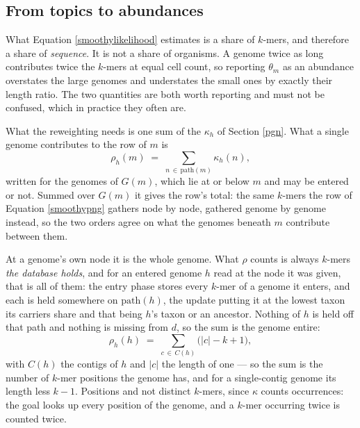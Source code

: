 \documentclass[pdflatex,sn-vancouver-num]{sn-jnl}
\begin{document}
    \subsection{From topics to abundances}\label{abundances}
    What Equation \eqref{smoothylikelihood} estimates is a share of $k$-mers, and therefore a share of
    \emph{sequence}. It is not a share of organisms. A genome twice as long contributes twice the
    $k$-mers at equal cell count, so reporting $\theta_m$ as an abundance overstates the large genomes
    and understates the small ones by exactly their length ratio. The two quantities are both worth
    reporting and must not be confused, which in practice they often are.

    What the reweighting needs is one sum of the $\kappa_h$ of Section \ref{pgn}. What a single
    genome contributes to the row of $m$ is
    \begin{equation}\label{smoothyrho}
        \rho_h(m) \;=\; \sum_{n \,\in\, \mathrm{path}(m)} \kappa_h(n) ,
    \end{equation}
    written for the genomes of $G(m)$, which lie at or below $m$ and may be entered or not.
    Summed over $G(m)$ it gives the row's total: the same $k$-mers the row of
    Equation \eqref{smoothypng} gathers node by node, gathered genome by genome instead, so the two
    orders agree on what the genomes beneath $m$ contribute between them.

    At a genome's own node it is the whole genome. What $\rho$ counts is always $k$-mers \emph{the
    database holds}, and for an entered genome $h$ read at the node it was given, that is all of them: the entry phase stores every $k$-mer of a genome it enters, and each is
    held somewhere on $\mathrm{path}(h)$, the update putting it at the lowest taxon its carriers
    share and that being $h$'s taxon or an ancestor. Nothing of $h$ is held off that path and nothing
    is missing from $d$, so the sum is the genome entire:
    \begin{equation}\label{smoothyrhog}
        \rho_h(h) \;=\; \sum_{c \,\in\, C(h)} \bigl( \lvert c \rvert - k + 1 \bigr) ,
    \end{equation}
    with $C(h)$ the contigs of $h$ and $\lvert c \rvert$ the length of one --- so the sum is the
    number of $k$-mer positions the genome has, and for a single-contig genome its length less
    $k - 1$. Positions and not distinct $k$-mers, since $\kappa$ counts
    occurrences: the goal looks up every position of the genome, and a $k$-mer occurring twice is
    counted twice.
\end{document}
